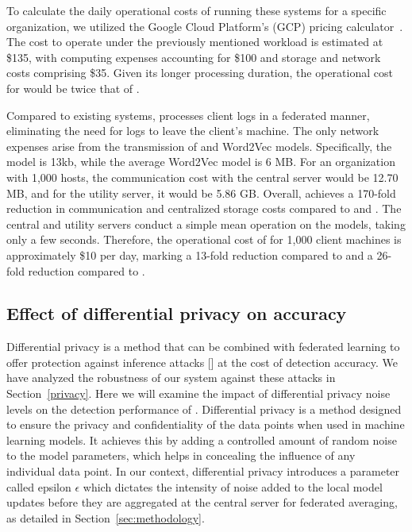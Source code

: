 To calculate the daily operational costs of running these systems for a specific organization, we utilized the Google Cloud Platform's (GCP) pricing calculator~\cite{gcp}. The cost to operate \flash under the previously mentioned workload is estimated at \$135, with computing expenses accounting for \$100 and storage and network costs comprising \$35. Given its longer processing duration, the operational cost for \kairos would be twice that of \flash.

Compared to existing systems, \Sys processes client logs in a federated manner, eliminating the need for logs to leave the client's machine. The only network expenses arise from the transmission of \gnnshort and Word2Vec models. Specifically, the \gnnshort model is 13kb, while the average Word2Vec model is 6 MB. For an organization with 1,000 hosts, the communication cost with the central server would be 12.70 MB, and for the utility server, it would be 5.86 GB. Overall, \Sys achieves a 170-fold reduction in communication and centralized storage costs compared to \flash and \kairos. The central and utility servers conduct a simple mean operation on the models, taking only a few seconds. Therefore, the operational cost of \Sys for 1,000 client machines is approximately \$10 per day, marking a 13-fold reduction compared to \flash and a 26-fold reduction compared to \kairos.

\subsection{Effect of differential privacy on accuracy}

Differential privacy is a method that can be combined with federated learning to offer protection against inference attacks [] at the cost of detection accuracy. We have analyzed the robustness of our system against these attacks in Section~\ref{privacy}. Here we will examine the impact of differential privacy noise levels on the detection performance of \Sys. Differential privacy is a method designed to ensure the privacy and confidentiality of the data points when used in machine learning models. It achieves this by adding a controlled amount of random noise to the model parameters, which helps in concealing the influence of any individual data point. In our context, differential privacy introduces a parameter called epsilon $\epsilon$ which dictates the intensity of noise added to the local \gnnshort model updates before they are aggregated at the central server for federated averaging, as detailed in Section~\ref{sec:methodology}.

